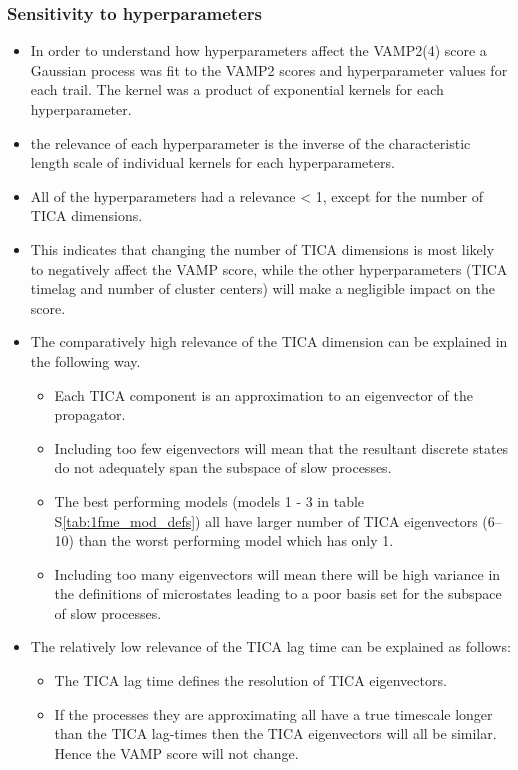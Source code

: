 \documentclass[journal=jacsat,manuscript=article]{achemso}
\newcommand*\sref[1]{%
    S\ref{#1}}
\begin{document}
\subsubsection{Sensitivity to hyperparameters}

\begin{itemize}
    \item In order to understand how hyperparameters affect the VAMP2(4) score a Gaussian process was fit to the VAMP2 scores and hyperparameter values for each trail. The kernel was a product of exponential kernels for each hyperparameter.  
    \item the relevance of each hyperparameter is the inverse of the characteristic length scale of individual kernels for each hyperparameters. 
    \item All of the hyperparameters had a relevance < 1, except for the number of TICA dimensions. 
    \item This indicates that changing the number of TICA dimensions is most likely to negatively affect the VAMP score, while the other hyperparameters (TICA timelag and number of cluster centers) will make a negligible impact on the score. 
    \item The comparatively high relevance of the TICA dimension can be explained in the following way. 
    \begin{itemize}
        \item Each TICA component is an approximation to an eigenvector of the propagator. 
        \item Including too few eigenvectors will mean that the resultant discrete states do not adequately span the subspace of slow processes. 
        \item The best performing models (models 1 - 3 in table \sref{tab:1fme_mod_defs}) all have larger number of TICA eigenvectors (\numrange{6}{10}) than the worst performing model which has only 1. 
        \item Including too many eigenvectors will mean there will be high variance in the definitions of microstates leading to a poor basis set for the subspace of slow processes.  
    \end{itemize}
    \item The relatively low relevance of the TICA lag time can be explained as follows: 
    \begin{itemize}
        \item The TICA lag time defines the resolution of TICA eigenvectors.  
        \item If the processes they are approximating all have a true timescale longer than the TICA lag-times then the TICA eigenvectors will all be similar. Hence the VAMP score will not change. 

\end{itemize}
\end{itemize}
\end{document}

